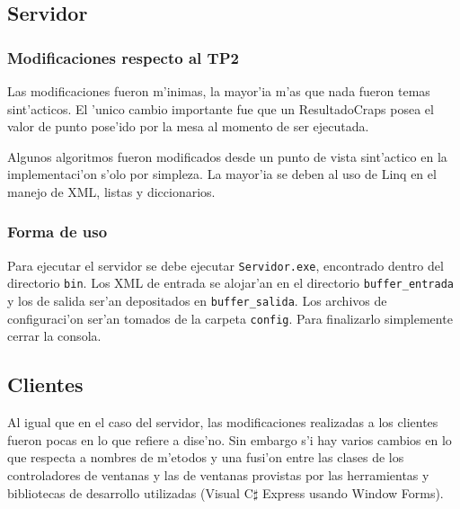 \subsection{Servidor}
\subsubsection{Modificaciones respecto al TP2}
Las modificaciones fueron m'inimas, la mayor'ia m'as que nada fueron temas sint'acticos. El 'unico cambio importante fue que un ResultadoCraps posea el valor de punto pose'ido por la mesa al momento de ser ejecutada.

Algunos algoritmos fueron modificados desde un punto de vista sint'actico en la implementaci'on s'olo por simpleza. La mayor'ia se deben al uso de Linq en el manejo de XML, listas y diccionarios.

\subsubsection{Forma de uso}
Para ejecutar el servidor se debe ejecutar \verb|Servidor.exe|, encontrado dentro del directorio \verb|bin|. Los XML de entrada se alojar'an en el directorio \verb|buffer_entrada| y los de salida ser'an depositados en \verb|buffer_salida|. Los archivos de configuraci'on ser'an tomados de la carpeta \verb|config|. Para finalizarlo simplemente cerrar la consola.

\subsection{Clientes}
Al igual que en el caso del servidor, las modificaciones realizadas a los clientes fueron pocas en lo que refiere a dise'no. Sin embargo s'i hay varios cambios en lo que respecta a nombres de m'etodos y una fusi'on entre las clases de los controladores de ventanas y las de ventanas provistas por las herramientas y bibliotecas de desarrollo utilizadas (Visual C$\sharp$ Express usando Window Forms).

